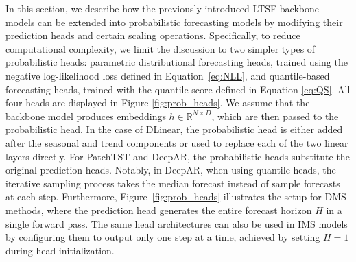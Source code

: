 \documentclass[a4paper,oneside,bibliography=totoc]{scrbook}
\begin{document}
In this section, we describe how the previously introduced LTSF backbone models can be extended into probabilistic forecasting models by modifying their prediction heads and certain scaling operations. 
Specifically, to reduce computational complexity, we limit the discussion to two simpler types of probabilistic heads: parametric distributional forecasting heads, trained using the negative log-likelihood loss defined in Equation~\ref{eq:NLL}, and quantile-based forecasting heads, trained with the quantile score defined in Equation \ref{eq:QS}. 
All four heads are displayed in Figure \ref{fig:prob_heads}.
We assume that the backbone model produces embeddings $h \in \mathbb{R}^{N \times D}$, which are then passed to the probabilistic head.
In the case of DLinear, the probabilistic head is either added after the seasonal and trend components or used to replace each of the two linear layers directly. For PatchTST and DeepAR, the probabilistic heads substitute the original prediction heads. Notably, in DeepAR, when using quantile heads, the iterative sampling process takes the median forecast instead of sample forecasts at each step.
Furthermore, Figure~\ref{fig:prob_heads} illustrates the setup for DMS methods, where the prediction head generates the entire forecast horizon $H$ in a single forward pass. The same head architectures can also be used in IMS models by configuring them to output only one step at a time, achieved by setting $H=1$ during head initialization.

\end{document}
